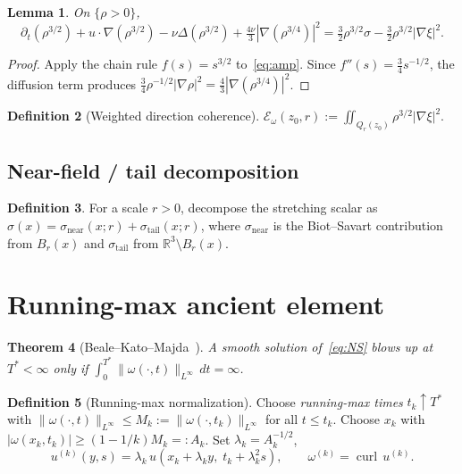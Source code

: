 \documentclass[12pt, reqno]{amsart}
\newtheorem{theorem}{Theorem}[section]
\newtheorem{lemma}[theorem]{Lemma}
\theoremstyle{definition}
\newtheorem{definition}[theorem]{Definition}
\theoremstyle{remark}
\numberwithin{equation}{section}
\newcommand{\R}{\mathbb{R}}
\DeclareMathOperator{\curl}{curl}
\newcommand{\Ecal}{\mathcal{E}}
\begin{document}
\begin{lemma}\label{lem:rho32}
On $\{\rho>0\}$,
\begin{equation}\label{eq:rho32}
\partial_t(\rho^{3/2}) + u\cdot\nabla(\rho^{3/2}) - \nu\Delta(\rho^{3/2})
+ \tfrac{4\nu}{3}|\nabla(\rho^{3/4})|^2
= \tfrac{3}{2}\rho^{3/2}\sigma - \tfrac{3}{2}\rho^{3/2}|\nabla\xi|^2.
\end{equation}
\end{lemma}
\begin{proof}
Apply the chain rule $f(s)=s^{3/2}$ to~\eqref{eq:amp}.  Since
$f''(s)=\tfrac34 s^{-1/2}$, the diffusion term produces
$\tfrac34\rho^{-1/2}|\nabla\rho|^2=\tfrac{4}{3}|\nabla(\rho^{3/4})|^2$.
\end{proof}

\begin{definition}[Weighted direction coherence]\label{def:Eomega}
$\Ecal_\omega(z_0,r):=\iint_{Q_r(z_0)}\rho^{3/2}|\nabla\xi|^2$.
\end{definition}

\subsection{Near-field / tail decomposition}

\begin{definition}\label{def:near-tail}
For a scale $r>0$, decompose the stretching scalar as
$\sigma(x)=\sigma_{\mathrm{near}}(x;r)+\sigma_{\mathrm{tail}}(x;r)$,
where $\sigma_{\mathrm{near}}$ is the Biot--Savart contribution from
$B_r(x)$ and $\sigma_{\mathrm{tail}}$ from $\R^3\setminus B_r(x)$.
\end{definition}

\section{Running-max ancient element}\label{sec:ancient}

\begin{theorem}[Beale--Kato--Majda~{\cite{BKM1984}}]\label{thm:BKM}
A smooth solution of~\eqref{eq:NS} blows up at $T^*<\infty$ only if
$\int_0^{T^*}\|\omega(\cdot,t)\|_{L^\infty}\,dt=\infty$.
\end{theorem}

\begin{definition}[Running-max normalization]\label{def:RM}
Choose \emph{running-max times} $t_k\uparrow T^*$ with
$\|\omega(\cdot,t)\|_{L^\infty}\le M_k:=\|\omega(\cdot,t_k)\|_{L^\infty}$
for all $t\le t_k$.  Choose $x_k$ with
$|\omega(x_k,t_k)|\ge(1-1/k)M_k=:A_k$.  Set $\lambda_k=A_k^{-1/2}$,
\begin{equation}\label{eq:rescaled}
u^{(k)}(y,s)=\lambda_k\,u(x_k+\lambda_k y,\;t_k+\lambda_k^2 s),
\qquad \omega^{(k)}=\curl\,u^{(k)}.
\end{equation}
\end{definition}
\end{document}

